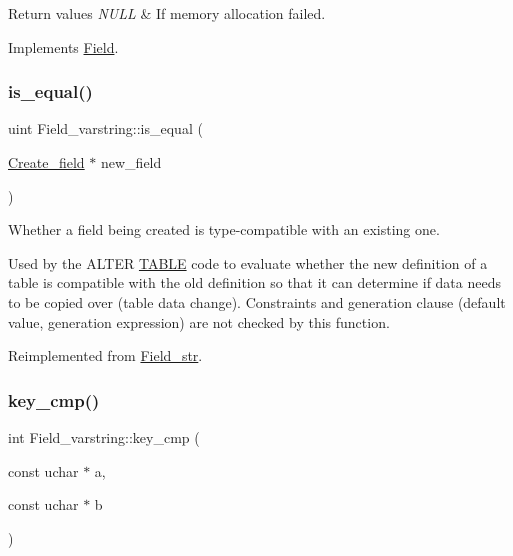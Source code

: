 \begin{DoxyRetVals}{Return values}
{\em N\+U\+LL} & If memory allocation failed. \\
\hline
\end{DoxyRetVals}


Implements \mbox{\hyperlink{classField_a01a9a9aa3a618941e839b1b8793c969d}{Field}}.

\mbox{\label{classField__varstring_aa0bfc217f9c90b2cc741cdec8b97dd5c}} 
\subsubsection{\texorpdfstring{is\+\_\+equal()}{is\_equal()}}
{\footnotesize\ttfamily uint Field\+\_\+varstring\+::is\+\_\+equal (\begin{DoxyParamCaption}\item[{\mbox{\hyperlink{classCreate__field}{Create\+\_\+field}} $\ast$}]{new\+\_\+field }\end{DoxyParamCaption})\hspace{0.3cm}{\ttfamily [virtual]}}

Whether a field being created is type-\/compatible with an existing one.

Used by the A\+L\+T\+ER \mbox{\hyperlink{structTABLE}{T\+A\+B\+LE}} code to evaluate whether the new definition of a table is compatible with the old definition so that it can determine if data needs to be copied over (table data change). Constraints and generation clause (default value, generation expression) are not checked by this function. 

Reimplemented from \mbox{\hyperlink{classField__str_a281f4c166dbbfd070c6038c8b6f1595a}{Field\+\_\+str}}.

\mbox{\label{classField__varstring_ad9e0c52fe4e88df9951362b98a0885f2}} 
\subsubsection{\texorpdfstring{key\+\_\+cmp()}{key\_cmp()}\hspace{0.1cm}{\footnotesize\ttfamily [1/2]}}
{\footnotesize\ttfamily int Field\+\_\+varstring\+::key\+\_\+cmp (\begin{DoxyParamCaption}\item[{const uchar $\ast$}]{a,  }\item[{const uchar $\ast$}]{b }\end{DoxyParamCaption})\hspace{0.3cm}{\ttfamily [virtual]}}

